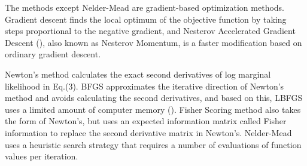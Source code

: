 The methods except Nelder-Mead are gradient-based optimization methods. Gradient descent finds the local optimum of the objective function by taking steps proportional to the negative gradient, and Nesterov Accelerated Gradient Descent (\cite{nesterov2004introductory}), also known as Nesterov Momentum, is a faster modification based on ordinary gradient descent.

Newton's method calculates the exact second derivatives of log marginal likelihood in Eq.(3). BFGS approximates the iterative direction of Newton's method and avoids calculating the second derivatives, and based on this, LBFGS uses a limited amount of computer memory (\cite{NoceWrig06}). Fisher Scoring method also takes the form of Newton's, but uses an expected information matrix called Fisher information to replace the second derivative matrix in Newton's. Nelder-Mead uses a heuristic search strategy that requires a number of evaluations of function values per iteration.




